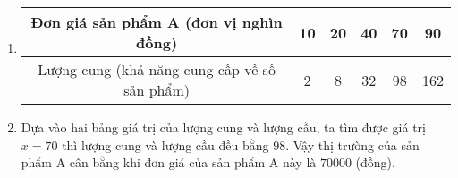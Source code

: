 \begin{ex}
{\begin{enumerate}
    $$
    T=\{338 ; 288 ; 200 ; 98 ; 50\} .
    $$
    \item
    \begin{tabular}{|c|c|c|c|c|c|}
        \hline Đơn giá sản phẩm A (đơn vị nghìn đồng) & 10 & 20 & 40 & 70 & 90 \\
        \hline Lượng cung (khả năng cung cấp về số sản phẩm) & 2 & 8 & 32 & 98 & 162 \\
        \hline
    \end{tabular}
    \item Dựa vào hai bảng giá trị của lượng cung và lượng cầu, ta tìm được giá trị $x=70$ thì lượng cung và lượng cầu đều bằng $98$. Vậy thị trường của sản phẩm A cân bằng khi đơn giá của sản phẩm A này là $70000$ (đồng).
\end{enumerate}
}
\end{ex}
